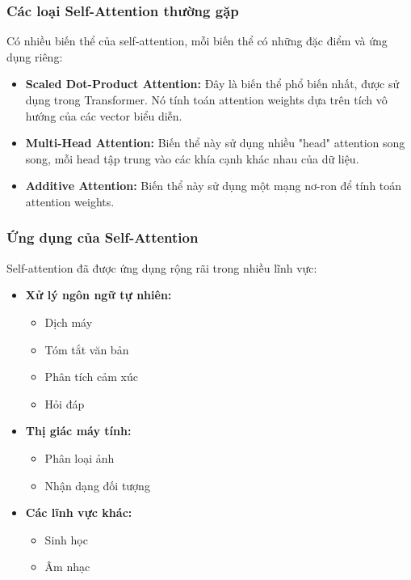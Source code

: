 \subsubsection{Các loại Self-Attention thường gặp}

Có nhiều biến thể của self-attention, mỗi biến thể có những đặc điểm và ứng dụng riêng:

\begin{itemize}
    \item \textbf{Scaled Dot-Product Attention:} Đây là biến thể phổ biến nhất, được sử dụng trong Transformer. Nó tính toán attention weights dựa trên tích vô hướng của các vector biểu diễn.
    \item \textbf{Multi-Head Attention:}  Biến thể này sử dụng nhiều "head" attention song song, mỗi head tập trung vào các khía cạnh khác nhau của dữ liệu.
    \item \textbf{Additive Attention:} Biến thể này sử dụng một mạng nơ-ron để tính toán attention weights.
\end{itemize}

\subsubsection{Ứng dụng của Self-Attention}

Self-attention đã được ứng dụng rộng rãi trong nhiều lĩnh vực:

\begin{itemize}
    \item \textbf{Xử lý ngôn ngữ tự nhiên:} 
    \begin{itemize}
        \item Dịch máy
        \item Tóm tắt văn bản
        \item Phân tích cảm xúc
        \item Hỏi đáp
    \end{itemize}
    \item \textbf{Thị giác máy tính:}
    \begin{itemize}
        \item Phân loại ảnh
        \item Nhận dạng đối tượng
    \end{itemize}
    \item \textbf{Các lĩnh vực khác:}
    \begin{itemize}
        \item Sinh học
        \item Âm nhạc
    \end{itemize}
\end{itemize}

